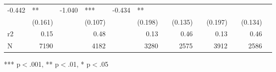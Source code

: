 \documentclass{article}
\begin{document}
\begin{table}[!h]
\begin{tabular}{lllllllllllll}
  \multicolumn{1}{r}{-0.442} &
  \multicolumn{1}{l}{**} &
  \multicolumn{1}{r}{-1.040} &
  \multicolumn{1}{l}{***} &
  \multicolumn{1}{r}{-0.434} &
  \multicolumn{1}{l}{**} \\
\multicolumn{1}{l}{} &
  \multicolumn{1}{r}{(0.161)} &
  \multicolumn{1}{l}{} &
  \multicolumn{1}{r}{(0.107)} &
  \multicolumn{1}{l}{} &
  \multicolumn{1}{r}{(0.198)} &
  \multicolumn{1}{l}{} &
  \multicolumn{1}{r}{(0.135)} &
  \multicolumn{1}{l}{} &
  \multicolumn{1}{r}{(0.197)} &
  \multicolumn{1}{l}{} &
  \multicolumn{1}{r}{(0.134)} &
  \multicolumn{1}{l}{} \\
\multicolumn{1}{l}{r2} &
  \multicolumn{1}{r}{0.15} &
  \multicolumn{1}{l}{} &
  \multicolumn{1}{r}{0.48} &
  \multicolumn{1}{l}{} &
  \multicolumn{1}{r}{0.13} &
  \multicolumn{1}{l}{} &
  \multicolumn{1}{r}{0.46} &
  \multicolumn{1}{l}{} &
  \multicolumn{1}{r}{0.13} &
  \multicolumn{1}{l}{} &
  \multicolumn{1}{r}{0.46} &
  \multicolumn{1}{l}{} \\
\multicolumn{1}{l}{N} &
  \multicolumn{1}{r}{7190} &
  \multicolumn{1}{l}{} &
  \multicolumn{1}{r}{4182} &
  \multicolumn{1}{l}{} &
  \multicolumn{1}{r}{3280} &
  \multicolumn{1}{l}{} &
  \multicolumn{1}{r}{2575} &
  \multicolumn{1}{l}{} &
  \multicolumn{1}{r}{3912} &
  \multicolumn{1}{l}{} &
  \multicolumn{1}{r}{2586} &
  \multicolumn{1}{l}{} \\
\cline{1-13}
\end{tabular}

\footnotesize{
*** p$<$.001, ** p$<$.01, * p$<$.05
}
\end{table}
\end{document}
